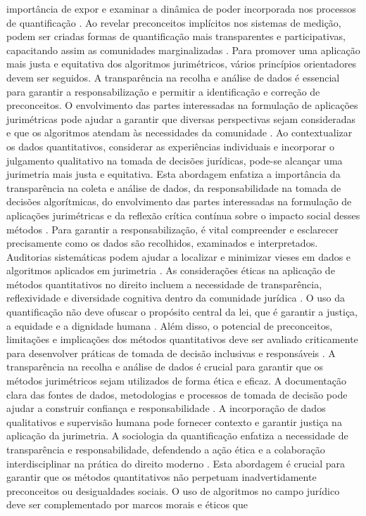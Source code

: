 importância de expor e examinar a dinâmica de poder incorporada nos processos de quantificação \cite{10.1057/s41599-020-00557-0,10.1080/07329113.2015.1046739}. Ao revelar preconceitos implícitos nos sistemas de medição, podem ser criadas formas de quantificação mais transparentes e participativas, capacitando assim as comunidades marginalizadas \cite{10.1057/s41599-020-00557-0,10.1080/07329113.2015.1046739}. Para promover uma aplicação mais justa e equitativa dos algoritmos jurimétricos, vários princípios orientadores devem ser seguidos. A transparência na recolha e análise de dados é essencial para garantir a responsabilização e permitir a identificação e correção de preconceitos. O envolvimento das partes interessadas na formulação de aplicações jurimétricas pode ajudar a garantir que diversas perspectivas sejam consideradas e que os algoritmos atendam às necessidades da comunidade \cite{10.1590/dados.2022.65.3.267}. Ao contextualizar os dados quantitativos, considerar as experiências individuais e incorporar o julgamento qualitativo na tomada de decisões jurídicas, pode-se alcançar uma jurimetria mais justa e equitativa. Esta abordagem enfatiza a importância da transparência na coleta e análise de dados, da responsabilidade na tomada de decisões algorítmicas, do envolvimento das partes interessadas na formulação de aplicações jurimétricas e da reflexão crítica contínua sobre o impacto social desses métodos \cite{10.1590/dados.2022.65.3.267}. Para garantir a responsabilização, é vital compreender e esclarecer precisamente como os dados são recolhidos, examinados e interpretados. Auditorias sistemáticas podem ajudar a localizar e minimizar vieses em dados e algoritmos aplicados em jurimetria \cite{10.1590/dados.2022.65.3.267,inthelawviewmetadatacitationsimilarpapers2014}. As considerações éticas na aplicação de métodos quantitativos no direito incluem a necessidade de transparência, reflexividade e diversidade cognitiva dentro da comunidade jurídica \cite{silva2023role,nunes2016jurimetria}. O uso da quantificação não deve ofuscar o propósito central da lei, que é garantir a justiça, a equidade e a dignidade humana \cite{silva2023role,nunes2016jurimetria}. Além disso, o potencial de preconceitos, limitações e implicações dos métodos quantitativos deve ser avaliado criticamente para desenvolver práticas de tomada de decisão inclusivas e responsáveis \cite{silva2023role,nunes2016jurimetria}. A transparência na recolha e análise de dados é crucial para garantir que os métodos jurimétricos sejam utilizados de forma ética e eficaz. A documentação clara das fontes de dados, metodologias e processos de tomada de decisão pode ajudar a construir confiança e responsabilidade \cite{unger2021process}. A incorporação de dados qualitativos e supervisão humana pode fornecer contexto e garantir justiça na aplicação da jurimetria. A sociologia da quantificação enfatiza a necessidade de transparência e responsabilidade, defendendo a ação ética e a colaboração interdisciplinar na prática do direito moderno \cite{10.1007/s11186-021-09453-1,salais2016quantification}. Esta abordagem é crucial para garantir que os métodos quantitativos não perpetuam inadvertidamente preconceitos ou desigualdades sociais. O uso de algoritmos no campo jurídico deve ser complementado por marcos morais e éticos que 
